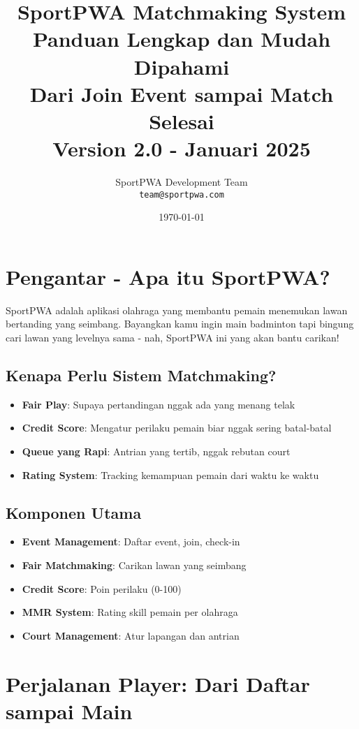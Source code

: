 \documentclass[12pt]{article}
\title{
    \vspace{-2cm}
    {\Huge\textbf{SportPWA Matchmaking System}}\\
    \vspace{0.5cm}
    {\Large Panduan Lengkap dan Mudah Dipahami}\\
    \vspace{0.3cm}
    {\large Dari Join Event sampai Match Selesai}\\
    \vspace{0.3cm}
    {\large Version 2.0 - Januari 2025}
}
\author{
    SportPWA Development Team\\
    \texttt{team@sportpwa.com}
}
\date{\today}
\begin{document}
\maketitle

\tableofcontents
\newpage

\section{Pengantar - Apa itu SportPWA?}

SportPWA adalah aplikasi olahraga yang membantu pemain menemukan lawan bertanding yang seimbang. Bayangkan kamu ingin main badminton tapi bingung cari lawan yang levelnya sama - nah, SportPWA ini yang akan bantu carikan!

\subsection{Kenapa Perlu Sistem Matchmaking?}
\begin{itemize}
    \item \textbf{Fair Play}: Supaya pertandingan nggak ada yang menang telak
    \item \textbf{Credit Score}: Mengatur perilaku pemain biar nggak sering batal-batal
    \item \textbf{Queue yang Rapi}: Antrian yang tertib, nggak rebutan court
    \item \textbf{Rating System}: Tracking kemampuan pemain dari waktu ke waktu
\end{itemize}

\subsection{Komponen Utama}
\begin{itemize}
    \item \textbf{Event Management}: Daftar event, join, check-in
    \item \textbf{Fair Matchmaking}: Carikan lawan yang seimbang
    \item \textbf{Credit Score}: Poin perilaku (0-100)
    \item \textbf{MMR System}: Rating skill pemain per olahraga
    \item \textbf{Court Management}: Atur lapangan dan antrian
\end{itemize}

\section{Perjalanan Player: Dari Daftar sampai Main}
\end{document}
